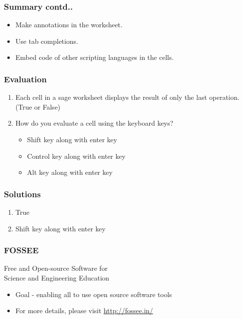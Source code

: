 \documentclass[17pt,compress]{beamer}
\begin{document}
\begin{frame}
\frametitle{Summary contd..}
\label{sec-5.3}

\begin{itemize}
\item Make annotations in the worksheet.
\item Use tab completions.
\item Embed code of other scripting languages in the cells.
\end{itemize}
\end{frame}
\begin{frame}
\frametitle{Evaluation}
\label{sec-6}


\begin{enumerate}
\item Each cell in a sage worksheet displays the result of only the last
     operation. (True or False)\pause
\vspace{12pt}
\item How do you evaluate a cell using the keyboard keys?\pause
	\begin{itemize}
	\item Shift key along with enter key
	\item Control key along with enter key
	\item Alt key along with enter key
	\end{itemize}
\end{enumerate}
\end{frame}
\begin{frame}
\frametitle{Solutions}
\label{sec-7}


\begin{enumerate}
\item True\pause
\vspace{12pt}
\item Shift key along with enter key
\end{enumerate}
\end{frame}
\begin{frame}
\frametitle{FOSSEE}
{\color{blue}Free and Open-source Software for \\Science and Engineering Education} \\
\begin{itemize}
\item Goal - enabling all to use open source software tools
\item For more details, please visit {\color{blue}\url{http://fossee.in/}}
\end{itemize}
\end{frame}
\end{document}
